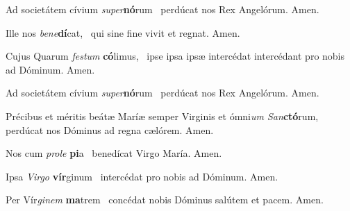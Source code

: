 \documentclass[invitatoriale-romanum.tex]{subfiles}
\begin{document}
Ad societátem cívium \textit{super}\textbf{nó}rum~\GreSpecial{*}
perdúcat nos Rex Angelórum.
\hspace{\specialcharhsep}\rr Amen.


Ille nos \textit{bene}\textbf{dí}cat,~\GreSpecial{*}
qui sine fine vivit et regnat.
\hspace{\specialcharhsep}\rr Amen.

Cujus  Quarum\rubric{)} \textit{festum} \textbf{có}limus,~\GreSpecial{*}
ipse  ipsa  ipsæ\rubric{)}
intercédat  intercédant\rubric{)} pro nobis ad Dóminum.
\hspace{\specialcharhsep}\rr Amen.

Ad societátem cívium \textit{super}\textbf{nó}rum~\GreSpecial{*}
perdúcat nos Rex Angelórum.
\hspace{\specialcharhsep}\rr Amen.

\pagebreak




Précibus et méritis beátæ Maríæ semper Virginis
et ómni\textit{um San}\textbf{ctó}rum,~\GreSpecial{*}
perdúcat nos Dóminus ad regna cælórem.
\hspace{\specialcharhsep}\rr Amen.


Nos cum \textit{prole} \textbf{pi}a~\GreSpecial{*}
benedícat Virgo María.
\hspace{\specialcharhsep}\rr Amen.

Ipsa \textit{Virgo} \textbf{vír}ginum~\GreSpecial{*}
intercédat pro nobis ad Dóminum.
\hspace{\specialcharhsep}\rr Amen.

Per Vír\textit{ginem} \textbf{ma}trem~\GreSpecial{*}
concédat nobis Dóminus salútem et pacem.
\hspace{\specialcharhsep}\rr Amen.
\end{document}
